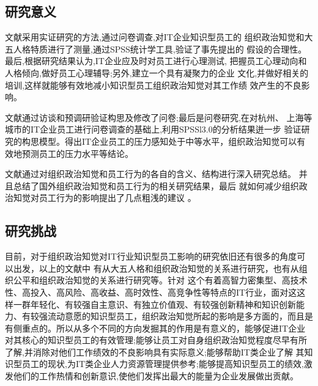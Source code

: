\documentclass[10pt,a4paper]{article}
\begin{document}
\begin{CJK*}{UTF8}{gkai}
\subsection{研究意义}
文献\cite{7}采用实证研究的方法,通过问卷调查,对IT企业知识型员工的
组织政治知觉和大五人格特质进行了测量,通过SPSS统计学工具,验证了事先提出的
假设的合理性。最后,根据研究结果认为,IT企业应及时对员工进行心理测试,
把握员工心理动向和人格倾向,做好员工心理辅导;另外,建立一个具有凝聚力的企业
文化,并做好相关的培训,这样就能够有效地减小知识型员工组织政治知觉对其工作绩
效产生的不良影响。


文献\cite{8}通过访谈和预调研验证构思及修改了问卷;最后是问卷研究,在对杭州、
上海等城市的IT企业员工进行问卷调查的基础上,利用SPSSl3.0的分析结果迸一步
验证研究的构思模型。得出IT企业员工的压力感知处于中等水平，组织政治知觉可以有效地预测员工的压力水平等结论。


文献\cite{9}通过对组织政治知觉和员工行为的各自的含义、结构进行深入研究总结。
并且总结了国外组织政治知觉和员工行为的相关研究结果，最后 
就如何减少组织政治知觉对员工行为的影响提出了几点粗浅的建议 。
 


\subsection{研究挑战}
目前，对于组织政治知觉对IT行业知识型员工影响的研究依旧还有很多的角度可以出发，以上的文献中
有从大五人格和组织政治知觉的关系进行研究，也有从组织公平和组织政治知觉的关系进行研究等。针对
这个有着高智力密集型、高技术性、高投入、高风险、高收益、高时效性、高竞争性等特点的IT行业，面对这这样一群年轻化、有较强自主意识、有独立价值观、有较强创新精神和知识创新能力、有较强流动意愿的知识型员工，组织政治知觉所起的影响是多方面的，而且是有侧重点的。所以从多个不同的方向发掘其的作用是有意义的，能够促进IT企业对其核心的知识型员工的有效管理;能够让员工对自身组织政治知觉程度尽早有所了解,并消除对他们工作绩效的不良影响具有实际意义;能够帮助IT类企业了解
其知识型员工的现状,为IT类企业人力资源管理提供参考;能够提高知识型员工的绩效,激发他们的工作热情和创新意识,使他们发挥出最大的能量为企业发展做出贡献。
		
		

\clearpage     
\end{CJK*}
\end{document}

